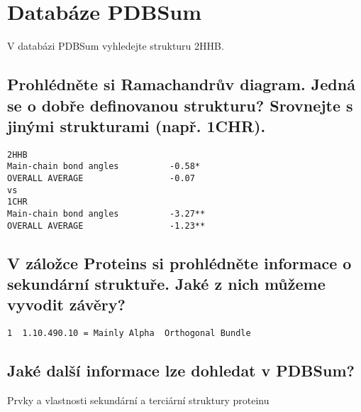 \documentclass[11pt]{article}
\begin{document}
\section{Databáze PDBSum}
\label{sec:org87b8ddd}
V databázi PDBSum vyhledejte strukturu 2HHB.

\subsection{Prohlédněte si Ramachandrův diagram. Jedná se o dobře definovanou strukturu? Srovnejte s jinými strukturami (např. 1CHR).}
\label{sec:orgbd284ab}
\begin{verbatim}
2HHB
Main-chain bond angles          -0.58*
OVERALL AVERAGE                 -0.07
vs
1CHR
Main-chain bond angles          -3.27**
OVERALL AVERAGE                 -1.23**
\end{verbatim}
\subsection{V záložce Proteins si prohlédněte informace o sekundární struktuře. Jaké z nich můžeme vyvodit závěry?}
\label{sec:orgfc235fc}
\begin{verbatim}
1  1.10.490.10 = Mainly Alpha  Orthogonal Bundle
\end{verbatim}
\subsection{Jaké další informace lze dohledat v PDBSum?}
\label{sec:org204cfb9}
Prvky a vlastnosti sekundární a terciární struktury proteinu
\end{document}
